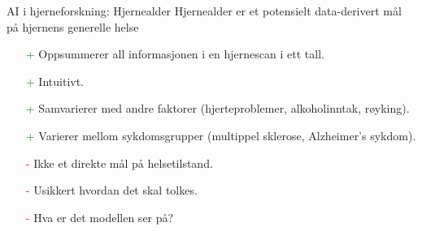 \documentclass[8pt]{beamer}
\begin{document}
	\begin{frame}{AI i hjerneforskning: Hjernealder} %
		Hjernealder er et potensielt data-derivert mål på hjernens generelle helse
		\begin{itemize}
			\item[\textcolor{green}+] Oppsummerer all informasjonen i en hjernescan i ett tall.
			\item[\textcolor{green}+] Intuitivt.
			\item[\textcolor{green}+] Samvarierer med andre faktorer (hjerteproblemer, alkoholinntak, røyking).
			\item[\textcolor{green}+] Varierer mellom sykdomsgrupper (multippel sklerose, Alzheimer's sykdom).
			\item[\textcolor{red}-] Ikke et direkte mål på helsetilstand.
			\item[\textcolor{red}-] Usikkert hvordan det skal tolkes.
			\item[\textcolor{red}-] Hva er det modellen ser på?
		\end{itemize}
	\end{frame}

\end{document}
